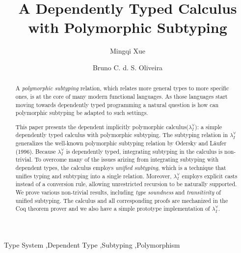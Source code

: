 \documentclass{elsarticle}
\title{A Dependently Typed Calculus with Polymorphic Subtyping}
\author{Mingqi Xue}
\author{Bruno C. d. S. Oliveira}
\newcommand{\system}[0]{the dependent implicitly polymorphic calculus\xspace}
\newcommand{\name}[0]{$\lambda_{I}^{\forall}$\xspace}
\begin{document}
\begin{abstract}
  A \emph{polymorphic subtyping} relation, which relates more general types
  to more specific ones, is at the core of many modern functional languages.
  As those languages start moving towards dependently typed programming a
  natural question is how can polymorphic subtyping be adapted to such settings.

  This paper presents \system (\name): a simple dependently typed calculus
  with polymorphic subtyping. The subtyping relation in \name
  generalizes the well-known polymorphic subtyping relation by
  Odersky and L\"aufer (1996). Because \name is dependently typed,
  integrating subtyping in the calculus is non-trivial. To overcome
  many of the issues arizing from integrating subtyping with dependent
  types, the calculus employs \emph{unified subtyping}, which is a technique
  that unifies typing and subtyping into a single relation. Moreover, \name
  employs explicit casts instead of a conversion rule, allowing
  unrestricted recursion to be naturally supported.
  We prove various non-trivial results, including \emph{type soundness} and \emph{transitivity}
  of unified subtyping. The calculus and all corresponding proofs
  are mechanized in the Coq theorem prover and we also have a simple prototype
  implementation of \name.
\end{abstract}


\begin{keyword}
  Type System \sep Dependent Type \sep Subtyping \sep Polymorphism
\end{keyword}

\maketitle








% 


\end{document}
